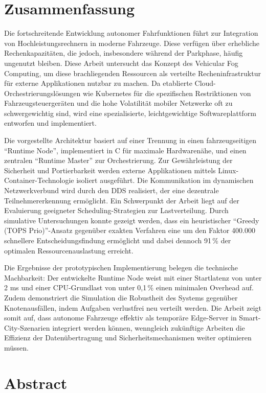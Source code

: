 \chapter*{Zusammenfassung}

Die fortschreitende Entwicklung autonomer Fahrfunktionen führt zur Integration von Hochleistungsrechnern in moderne Fahrzeuge. Diese verfügen über erhebliche Rechenkapazitäten, die jedoch, insbesondere während der Parkphase, häufig ungenutzt bleiben. Diese Arbeit untersucht das Konzept des Vehicular Fog Computing, um diese brachliegenden Ressourcen als verteilte Recheninfrastruktur für externe Applikationen nutzbar zu machen. Da etablierte Cloud-Orchestrierungslösungen wie Kubernetes für die spezifischen Restriktionen von Fahrzeugsteuergeräten und die hohe Volatilität mobiler Netzwerke oft zu schwergewichtig sind, wird eine spezialisierte, leichtgewichtige Softwareplattform entworfen und implementiert.

Die vorgestellte Architektur basiert auf einer Trennung in einen fahrzeugseitigen \enquote{Runtime Node}, implementiert in C für maximale Hardwarenähe, und einen zentralen \enquote{Runtime Master} zur Orchestrierung. Zur Gewährleistung der Sicherheit und Portierbarkeit werden externe Applikationen mittels Linux-Container-Technologie isoliert ausgeführt. Die Kommunikation im dynamischen Netzwerkverbund wird durch den \gls{DDS} realisiert, der eine dezentrale Teilnehmererkennung ermöglicht. Ein Schwerpunkt der Arbeit liegt auf der Evaluierung geeigneter Scheduling-Strategien zur Lastverteilung. Durch simulative Untersuchungen konnte gezeigt werden, dass ein heuristischer \enquote{Greedy (TOPS Prio)}-Ansatz gegenüber exakten Verfahren eine um den Faktor 400.000 schnellere Entscheidungsfindung ermöglicht und dabei dennoch 91\,\% der optimalen Ressourcenauslastung erreicht.

Die Ergebnisse der prototypischen Implementierung belegen die technische Machbarkeit: Der entwickelte Runtime Node weist mit einer Startlatenz von unter 2 ms und einer CPU-Grundlast von unter 0,1\,\% einen minimalen Overhead auf. Zudem demonstriert die Simulation die Robustheit des Systems gegenüber Knotenausfällen, indem Aufgaben verlustfrei neu verteilt werden. Die Arbeit zeigt somit auf, dass autonome Fahrzeuge effektiv als temporäre Edge-Server in Smart-City-Szenarien integriert werden können, wenngleich zukünftige Arbeiten die Effizienz der Datenübertragung und Sicherheitsmechanismen weiter optimieren müssen.

\chapter*{Abstract}

